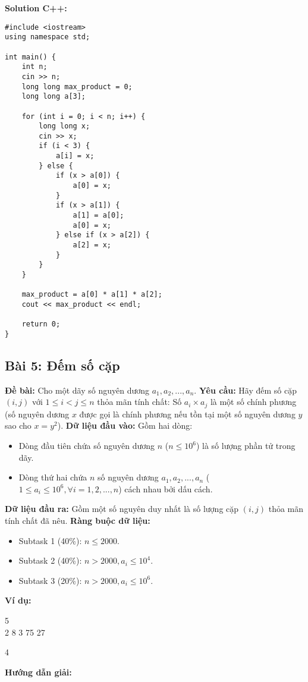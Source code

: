 \documentclass[12pt]{scrartcl}  %
\begin{document}
\textbf{Solution C++:}

\begin{lstlisting}
#include <iostream>
using namespace std;

int main() {
    int n;
    cin >> n;
    long long max_product = 0;
    long long a[3];
    
    for (int i = 0; i < n; i++) {
        long long x;
        cin >> x;
        if (i < 3) {
            a[i] = x;
        } else {
            if (x > a[0]) {
                a[0] = x;
            }
            if (x > a[1]) {
                a[1] = a[0];
                a[0] = x;
            } else if (x > a[2]) {
                a[2] = x;
            }
        }
    }
    
    max_product = a[0] * a[1] * a[2];
    cout << max_product << endl;
    
    return 0;
}
\end{lstlisting}

\subsection{Bài 5: Đếm số cặp}
\textbf{Đề bài:}
Cho một dãy số nguyên dương $a_1, a_2, ..., a_n$.
\textbf{Yêu cầu:}
Hãy đếm số cặp $(i, j)$ với $1 \leq i < j \leq n$ thỏa mãn tính chất: Số $a_i \times a_j$ là một số chính phương (số nguyên dương $x$ được gọi là chính phương nếu tồn tại một số nguyên dương $y$ sao cho $x = y^2$).
\textbf{Dữ liệu đầu vào:}
Gồm hai dòng:
\begin{itemize}
    \item Dòng đầu tiên chứa số nguyên dương $n$ ($n \leq 10^6$) là số lượng phần tử trong dãy.
    \item Dòng thứ hai chứa $n$ số nguyên dương $a_1, a_2, ..., a_n$ ($1 \leq a_i \leq 10^6, \forall i = 1,2,...,n$) cách nhau bởi dấu cách.
\end{itemize}
\textbf{Dữ liệu đầu ra:}
Gồm một số nguyên duy nhất là số lượng cặp $(i, j)$ thỏa mãn tính chất đã nêu.
\textbf{Ràng buộc dữ liệu:}
\begin{itemize}
    \item Subtask 1 (40\%): $n \leq 2000$.
    \item Subtask 2 (40\%): $n > 2000, a_i \leq 10^4$.
    \item Subtask 3 (20\%): $n > 2000, a_i \leq 10^6$.
\end{itemize}
\textbf{Ví dụ:}
\begin{tcolorbox}[colback=gray!5!white, colframe=blue!50!black, title=Input]
5\\
2 8 3 75 27
\end{tcolorbox}
\begin{tcolorbox}[colback=gray!5!white, colframe=green!50!black, title=Output]
4  
\end{tcolorbox}
\textbf{Hướng dẫn giải:}
\end{document}
